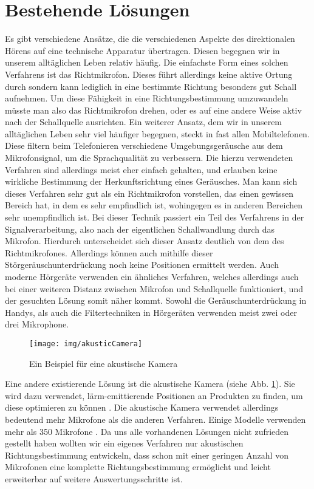 \section{Bestehende Lösungen} 
  Es gibt verschiedene Ansätze, die die verschiedenen Aspekte des direktionalen Hörens auf eine technische Apparatur übertragen. Diesen begegnen wir in unserem alltäglichen Leben relativ häufig. Die einfachste Form eines solchen Verfahrens ist das Richtmikrofon. Dieses führt allerdings keine aktive Ortung durch sondern kann lediglich in eine bestimmte Richtung besonders gut Schall aufnehmen. Um diese Fähigkeit in eine Richtungsbestimmung umzuwandeln müsste man also das Richtmikrofon drehen, oder es auf eine andere Weise aktiv nach der Schallquelle ausrichten. Ein weiterer Ansatz, dem wir in unserem alltäglichen Leben sehr viel häufiger begegnen, steckt in fast allen Mobiltelefonen. Diese filtern beim Telefonieren verschiedene Umgebungsgeräusche aus dem Mikrofonsignal, um die Sprachqualität zu verbessern. Die hierzu verwendeten Verfahren sind allerdings meist eher einfach gehalten, und erlauben keine wirkliche Bestimmung der Herkunftsrichtung eines Geräusches. Man kann sich dieses Verfahren sehr gut als ein Richtmikrofon vorstellen, das einen gewissen Bereich hat, in dem es sehr empfindlich ist, wohingegen es in anderen Bereichen sehr unempfindlich ist. Bei dieser Technik passiert ein Teil des Verfahrens in der Signalverarbeitung, also nach der eigentlichen Schallwandlung durch das Mikrofon. Hierdurch unterscheidet sich dieser Ansatz deutlich von dem des Richtmikrofones. Allerdings können auch mithilfe dieser Störgeräuschunterdrückung noch keine Positionen ermittelt werden. Auch moderne Hörgeräte verwenden ein ähnliches Verfahren, welches allerdings auch bei einer weiteren Distanz zwischen Mikrofon und Schallquelle funktioniert, und der gesuchten Lösung somit näher kommt. Sowohl die Geräuschunterdrückung in Handys, als auch die Filtertechniken in Hörgeräten verwenden meist zwei oder drei Mikrophone.
  \begin{figure}
    \centering
    \texttt{[image: img/akusticCamera]}
    \caption{Ein Beispiel für eine akustische Kamera \cite{camera}}
    \label{fig:camera}
  \end{figure}
  Eine andere existierende Lösung ist die akustische Kamera (siehe Abb. \ref{fig:camera}). Sie wird dazu verwendet, lärm-emittierende Positionen an Produkten zu finden, um diese optimieren zu können \cite{camera}. Die akustische Kamera verwendet allerdings bedeutend mehr Mikrofone als die anderen Verfahren. Einige Modelle verwenden mehr als 350 Mikrofone \cite{nmics}. Da uns alle vorhandenen Lösungen nicht zufrieden gestellt haben wollten wir ein eigenes Verfahren nur akustischen Richtungsbestimmung entwickeln, dass schon mit einer geringen Anzahl von Mikrofonen eine komplette Richtungsbestimmung ermöglicht und leicht erweiterbar auf weitere Auswertungsschritte ist.
